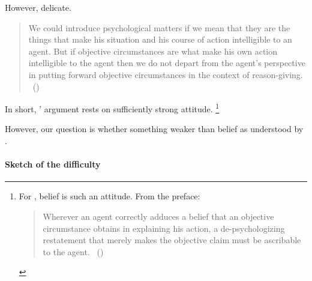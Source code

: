 \begin{note}
  However, delicate.
  \begin{quote}
    We could introduce psychological matters if we mean that they are the things that make his situation and his course of action intelligible to an agent.
    But if objective circumstances are what make his own action intelligible to the agent then we do not depart from the agent's perspective in putting forward objective circumstances in the context of reason-giving.%
    \mbox{ }\hfill\mbox{(\citeyear[120]{Collins:1997wn})}
  \end{quote}

  In short, \citeauthor{Collins:1997wn}' argument rests on sufficiently strong attitude.%
  \footnote{
    For \citeauthor{Collins:1997wn}, belief is such an attitude.
    From the preface:
    \begin{quote}
      Wherever an agent correctly adduces a belief that an objective circumstance obtains in explaining his action, a de-psychologizing restatement that merely makes the objective claim must be ascribable to the agent.%
      \mbox{ }\hfill\mbox{(\citeyear[120]{Collins:1997wn})}
    \end{quote}
  }

  However, our question is whether something weaker than belief as understood by \citeauthor{Collins:1997wn}.
\end{note}


\paragraph{Sketch of the difficulty}

